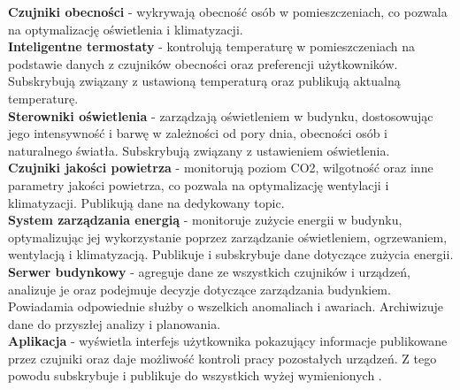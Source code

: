 \textbf{Czujniki obecności} - wykrywają obecność osób w pomieszczeniach, co pozwala na optymalizację oświetlenia i klimatyzacji.\\

\textbf{Inteligentne termostaty} - kontrolują temperaturę w pomieszczeniach na podstawie danych z czujników obecności oraz preferencji użytkowników. Subskrybują  związany z ustawioną temperaturą oraz publikują aktualną temperaturę.\\

\textbf{Sterowniki oświetlenia} - zarządzają oświetleniem w budynku, dostosowując jego intensywność i barwę w zależności od pory dnia, obecności osób i naturalnego światła. Subskrybują  związany z ustawieniem oświetlenia.\\

\textbf{Czujniki jakości powietrza} - monitorują poziom CO2, wilgotność oraz inne parametry jakości powietrza, co pozwala na optymalizację wentylacji i klimatyzacji. Publikują dane na dedykowany topic.\\

\textbf{System zarządzania energią} - monitoruje zużycie energii w budynku, optymalizując jej wykorzystanie poprzez zarządzanie oświetleniem, ogrzewaniem, wentylacją i klimatyzacją. Publikuje i subskrybuje dane dotyczące zużycia energii.\\

\textbf{Serwer budynkowy} - agreguje dane ze wszystkich czujników i urządzeń, analizuje je oraz podejmuje decyzje dotyczące zarządzania budynkiem. Powiadamia odpowiednie służby o wszelkich anomaliach i awariach. Archiwizuje dane do przyszłej analizy i planowania.\\

\textbf{Aplikacja} - wyświetla interfejs użytkownika pokazujący informacje publikowane przez czujniki oraz daje możliwość kontroli pracy pozostałych urządzeń. Z tego powodu subskrybuje i publikuje do wszystkich wyżej wymienionych .\\